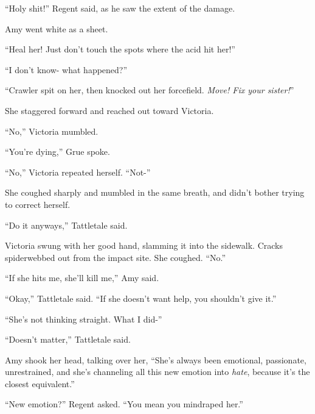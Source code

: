 ``Holy shit!''  Regent said, as he saw the extent of the damage.



Amy went white as a sheet.



``Heal her!  Just don't touch the spots where the acid hit her!''



``I don't know- what happened?''



``Crawler spit on her, then knocked out her forcefield.  \emph{Move!  Fix your sister!}''



She staggered forward and reached out toward Victoria.



``No,'' Victoria mumbled.



``You're dying,'' Grue spoke.



``No,'' Victoria repeated herself.  ``Not-''



She coughed sharply and mumbled in the same breath, and didn't bother trying to correct herself.



``Do it anyways,'' Tattletale said.



Victoria swung with her good hand, slamming it into the sidewalk.  Cracks spiderwebbed out from the impact site.  She coughed.  ``No.''



``If she hits me, she'll kill me,'' Amy said.



``Okay,'' Tattletale said.  ``If she doesn't want help, you shouldn't give it.''



``She's not thinking straight.  What I did-''



``Doesn't matter,'' Tattletale said.



Amy shook her head, talking over her, ``She's always been emotional, passionate, unrestrained, and she's channeling all this new emotion into \emph{hate}, because it's the closest equivalent.''



``New emotion?'' Regent asked.  ``You mean you mindraped her.''



